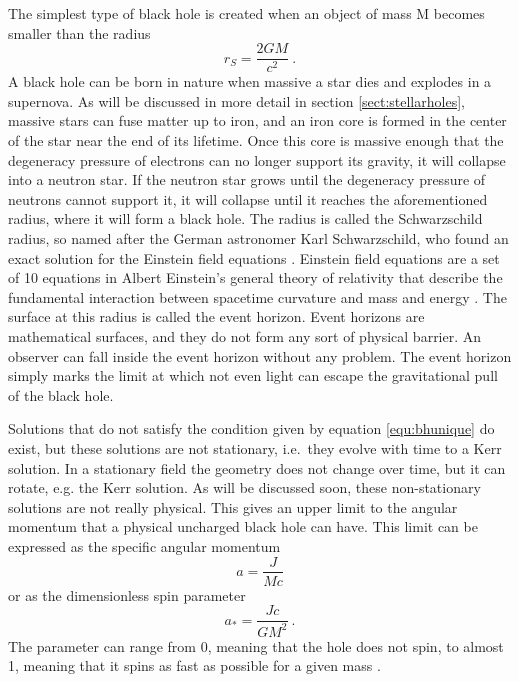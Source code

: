 \documentclass[english, oneside]{HYgradu}
\begin{document}
The simplest type of black hole is created when an object of mass M becomes smaller than the radius
\begin{equation}
r_S = \frac{2GM}{c^2} \ .
\end{equation}
A black hole can be born in nature when massive a star dies and explodes in a supernova. As will be discussed in more detail in section \ref{sect:stellarholes}, massive stars can fuse matter up to iron, and an iron core is formed in the center of the star near the end of its lifetime. Once this core is massive enough that the degeneracy pressure of electrons can no longer support its gravity, it will collapse into a neutron star. If the neutron star grows until the degeneracy pressure of neutrons cannot support it, it will collapse until it reaches the aforementioned radius, where it will form a black hole. The radius is called the Schwarzschild radius, so named after the German astronomer Karl Schwarzschild, who found an exact solution for the Einstein field equations \citep{schwarzschild:1916}. Einstein field equations are a set of 10 equations in Albert Einstein's general theory of relativity that describe the fundamental interaction between spacetime curvature and mass and energy \citep{einstein:1915}. The surface at this radius is called the event horizon. Event horizons are mathematical surfaces, and they do not form any sort of physical barrier. An observer can fall inside the event horizon without any problem. The event horizon simply marks the limit at which not even light can escape the gravitational pull of the black hole.

Solutions that do not satisfy the condition given by equation \ref{equ:bhunique} do exist, but these solutions are not stationary, i.e.\ they evolve with time to a Kerr solution. In a stationary field the geometry does not change over time, but it can rotate, e.g. the Kerr solution. As will be discussed soon, these non-stationary solutions are not really physical. This gives an upper limit to the angular momentum that a physical uncharged black hole can have. This limit can be expressed as the specific angular momentum 
\begin{equation} \label{equ:angularmomentum}
a = \frac{J}{Mc}
\end{equation}
or as the dimensionless spin parameter
\begin{equation}
a_* = \frac{Jc}{GM^2} \ .
\end{equation}
The parameter can range from 0, meaning that the hole does not spin, to almost 1, meaning that it spins as fast as possible for a given mass \citep{middleton:2016}.
\end{document}
